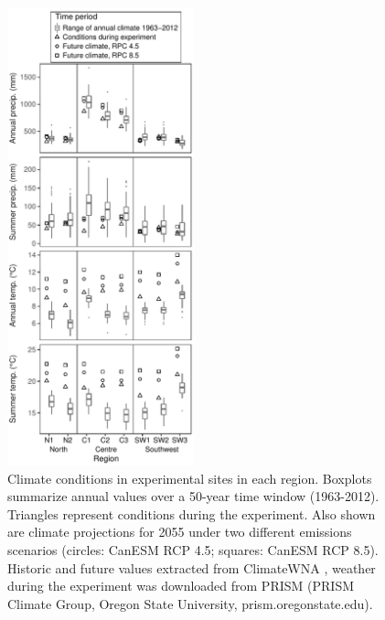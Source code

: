 \documentclass{article}
\begin{document}
\begin{figure}[p]
\centering
\includegraphics[width = 0.48\textwidth]{figs/climate}
\caption[Climate conditions in experimental sites in each region]{Climate conditions in experimental sites in each region. Boxplots summarize annual values over a 50-year time window (1963-2012). Triangles represent conditions during the experiment. Also shown are climate projections for 2055 under two different emissions scenarios (circles: CanESM RCP 4.5; squares: CanESM RCP 8.5). Historic and future values extracted from ClimateWNA \citep{wang2012climatewna}, weather during the experiment was downloaded from PRISM (PRISM Climate Group, Oregon State University, prism.oregonstate.edu).}
\label{climate}
\end{figure}


\clearpage
\end{document}
